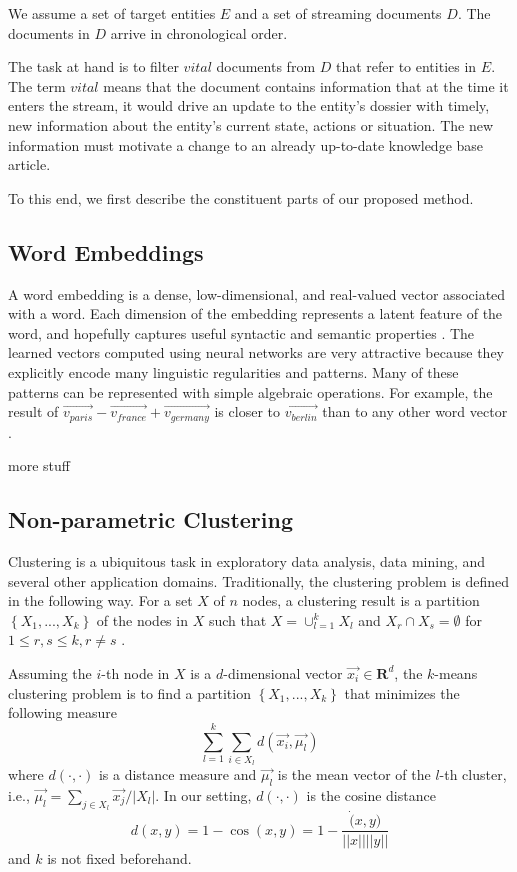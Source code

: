 \documentclass{article}
\begin{document}
We assume a set of target entities $E$ and a set of streaming documents $D$. The documents in $D$ arrive in chronological order.

The task at hand is to filter $vital$ documents from $D$ that refer to entities in $E$.
The term $vital$ means that the document contains information that at the time it enters the stream, it would drive an update to the entity's dossier with timely, new information about the entity's current state, actions or situation. The new information must motivate a change to an already up-to-date knowledge base article.

To this end, we first describe the constituent parts of our proposed method.

\subsection{Word Embeddings}

A word embedding is a dense, low-dimensional, and real-valued vector associated with a word. Each dimension of the embedding represents a latent feature of the word, and hopefully captures useful syntactic and semantic properties \cite{Turian10wordrepresentations}.
The learned vectors computed using neural networks are very attractive because they explicitly encode many linguistic regularities and patterns. Many of these patterns can be represented with simple algebraic operations. For example, the result of $\vec{v_{paris}} - \vec{v_{france}} + \vec{v_{germany}}$ is closer to $\vec{v_{berlin}}$ than to any other word vector \cite{mikolovChen,mikolovYih}.

more stuff

\subsection{Non-parametric Clustering}

Clustering is a ubiquitous task in exploratory data analysis, data mining, and several other application domains. %
Traditionally, the clustering problem is defined in the following way. For a set $X$ of $n$ nodes, a clustering result is a partition $\left\{ {X_1, ..., X_k}\right\}$ of the nodes in $X$ such that $X=\cup_{l=1}^{k}{X_l}$ and $X_r \cap X_s = \emptyset$ for $1 \leq r,s \leq k, r \ne s$ \cite{ChiSZHT07}.

Assuming the $i$-th node in $X$ is a $d$-dimensional vector $\vec{x_i} \in \mathbf{R}^d$, the $k$-means clustering problem is to find a partition $\left\{ {X_1, ..., X_k}\right\}$ that minimizes the following measure
\begin{equation}
\sum_{l=1}^{k} \sum_{i \in X_l} d(\vec{x_i},\vec{\mu_l})
\end{equation}
where $d(\cdot,\cdot)$ is a distance measure and $\vec{\mu_l}$ is the mean vector of the $l$-th cluster, i.e., $\vec{\mu_l} = \sum_{j \in X_l}{\vec{x_j}/|X_l|}$.
In our setting, $d(\cdot,\cdot)$ is the cosine distance
\begin{equation}
d(x,y) = 1 - \cos(x,y) = 1 - \frac{\dot(x,y)}{||x||||y||}
\end{equation}
and $k$ is not fixed beforehand.
\end{document}

